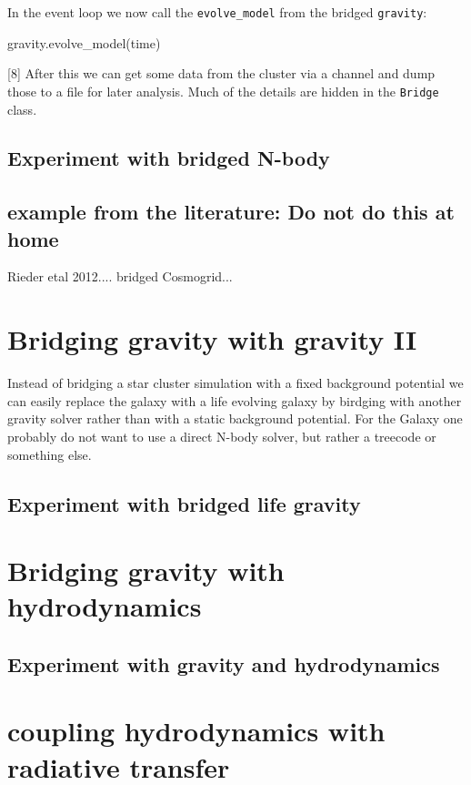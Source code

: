 In the event loop we now call the {\tt evolve\_model} from the bridged
{\tt gravity}:
\begin{verbatimtab}[8]
        gravity.evolve_model(time)
\end{verbatimtab}[8]
After this we can get some data from the cluster via a channel and
dump those to a file for later analysis.  Much of the details are
hidden in the {\tt Bridge} class.

\subsection{Experiment with bridged N-body}

\subsection{example from the literature: Do not do this at home}

Rieder etal 2012.... bridged Cosmogrid...

\section{Bridging gravity with gravity II}

Instead of bridging a star cluster simulation with a fixed background
potential we can easily replace the galaxy with a life evolving galaxy
by birdging with another gravity solver rather than with a static
background potential.  For the Galaxy one probably do not want to use
a direct N-body solver, but rather a treecode or something else.



\subsection{Experiment with bridged life gravity}

\section{Bridging gravity with hydrodynamics}
\subsection{Experiment with gravity and hydrodynamics}

\section{coupling hydrodynamics with radiative transfer}
